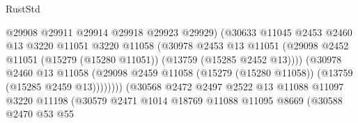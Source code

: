 \begin{lexlean}{RustStd}
\begin{coremodule}
                                          @29908
                                          @29911
                                          @29914
                                          @29918
                                          @29923
                                          @29929)
                                        (@30633
                                          @11045
                                          @2453
                                          @2460
                                          @13
                                          @3220
                                          @11051
                                          @3220
                                          @11058
                                          (@30978
                                            @2453
                                            @13
                                            @11051
                                            (@29098
                                              @2452
                                              @11051
                                              (@15279 (@15280 @11051))
                                              (@13759 (@15285 @2452 @13))))
                                          (@30978
                                            @2460
                                            @13
                                            @11058
                                            (@29098
                                              @2459
                                              @11058
                                              (@15279 (@15280 @11058))
                                              (@13759 (@15285 @2459 @13))))))))
                                  (@30568
                                    @2472
                                    @2497
                                    @2522
                                    @13
                                    @11088
                                    @11097
                                    @3220
                                    @11198
                                    (@30579
                                      @2471
                                      @1014
                                      @18769
                                      @11088
                                      @11095
                                      @8669
                                      (@30588
                                        @2470
                                        @53
                                        @55

\end{coremodule}
\end{lexlean}
